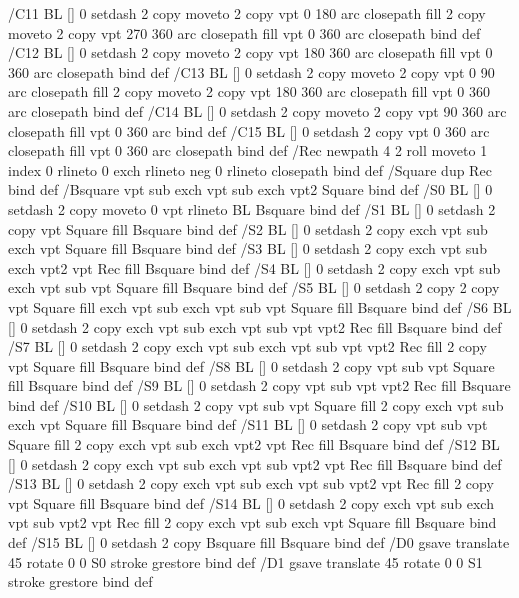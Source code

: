 {{/C11 { BL [] 0 setdash 2 copy moveto
       2 copy  vpt 0 180 arc closepath fill
       2 copy moveto
       2 copy  vpt 270 360 arc closepath fill
               vpt 0 360 arc closepath } bind def
/C12 { BL [] 0 setdash 2 copy moveto
       2 copy  vpt 180 360 arc closepath fill
               vpt 0 360 arc closepath } bind def
/C13 { BL [] 0 setdash  2 copy moveto
       2 copy  vpt 0 90 arc closepath fill
       2 copy moveto
       2 copy  vpt 180 360 arc closepath fill
               vpt 0 360 arc closepath } bind def
/C14 { BL [] 0 setdash 2 copy moveto
       2 copy  vpt 90 360 arc closepath fill
               vpt 0 360 arc } bind def
/C15 { BL [] 0 setdash 2 copy vpt 0 360 arc closepath fill
               vpt 0 360 arc closepath } bind def
/Rec   { newpath 4 2 roll moveto 1 index 0 rlineto 0 exch rlineto
       neg 0 rlineto closepath } bind def
/Square { dup Rec } bind def
/Bsquare { vpt sub exch vpt sub exch vpt2 Square } bind def
/S0 { BL [] 0 setdash 2 copy moveto 0 vpt rlineto BL Bsquare } bind def
/S1 { BL [] 0 setdash 2 copy vpt Square fill Bsquare } bind def
/S2 { BL [] 0 setdash 2 copy exch vpt sub exch vpt Square fill Bsquare } bind def
/S3 { BL [] 0 setdash 2 copy exch vpt sub exch vpt2 vpt Rec fill Bsquare } bind def
/S4 { BL [] 0 setdash 2 copy exch vpt sub exch vpt sub vpt Square fill Bsquare } bind def
/S5 { BL [] 0 setdash 2 copy 2 copy vpt Square fill
       exch vpt sub exch vpt sub vpt Square fill Bsquare } bind def
/S6 { BL [] 0 setdash 2 copy exch vpt sub exch vpt sub vpt vpt2 Rec fill Bsquare } bind def
/S7 { BL [] 0 setdash 2 copy exch vpt sub exch vpt sub vpt vpt2 Rec fill
       2 copy vpt Square fill
       Bsquare } bind def
/S8 { BL [] 0 setdash 2 copy vpt sub vpt Square fill Bsquare } bind def
/S9 { BL [] 0 setdash 2 copy vpt sub vpt vpt2 Rec fill Bsquare } bind def
/S10 { BL [] 0 setdash 2 copy vpt sub vpt Square fill 2 copy exch vpt sub exch vpt Square fill
       Bsquare } bind def
/S11 { BL [] 0 setdash 2 copy vpt sub vpt Square fill 2 copy exch vpt sub exch vpt2 vpt Rec fill
       Bsquare } bind def
/S12 { BL [] 0 setdash 2 copy exch vpt sub exch vpt sub vpt2 vpt Rec fill Bsquare } bind def
/S13 { BL [] 0 setdash 2 copy exch vpt sub exch vpt sub vpt2 vpt Rec fill
       2 copy vpt Square fill Bsquare } bind def
/S14 { BL [] 0 setdash 2 copy exch vpt sub exch vpt sub vpt2 vpt Rec fill
       2 copy exch vpt sub exch vpt Square fill Bsquare } bind def
/S15 { BL [] 0 setdash 2 copy Bsquare fill Bsquare } bind def
/D0 { gsave translate 45 rotate 0 0 S0 stroke grestore } bind def
/D1 { gsave translate 45 rotate 0 0 S1 stroke grestore } bind def
}}
